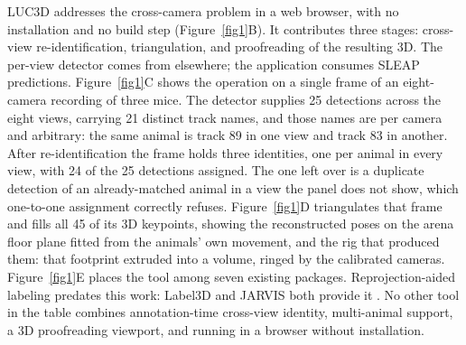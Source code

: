 \documentclass[pdflatex, sn-nature]{sn-jnl}
\theoremstyle{thmstyleone}%
\theoremstyle{thmstyletwo}%
\theoremstyle{thmstylethree}%
\begin{document}
LUC3D addresses the cross-camera problem in a web browser, with no installation and no build step (Figure~\ref{fig1}B). It contributes three stages: cross-view re-identification, triangulation, and proofreading of the resulting 3D. The per-view detector comes from elsewhere; the application consumes SLEAP predictions. Figure~\ref{fig1}C shows the operation on a single frame of an eight-camera recording of three mice. The detector supplies 25 detections across the eight views, carrying 21 distinct track names, and those names are per camera and arbitrary: the same animal is track 89 in one view and track 83 in another. After re-identification the frame holds three identities, one per animal in every view, with 24 of the 25 detections assigned. The one left over is a duplicate detection of an already-matched animal in a view the panel does not show, which one-to-one assignment correctly refuses. Figure~\ref{fig1}D triangulates that frame and fills all 45 of its 3D keypoints, showing the reconstructed poses on the arena floor plane fitted from the animals' own movement, and the rig that produced them: that footprint extruded into a volume, ringed by the calibrated cameras. Figure~\ref{fig1}E places the tool among seven existing packages. Reprojection-aided labeling predates this work: Label3D and JARVIS both provide it \citep{Hueser2023, Aldarondo2019}. No other tool in the table combines annotation-time cross-view identity, multi-animal support, a 3D proofreading viewport, and running in a browser without installation.
\end{document}
